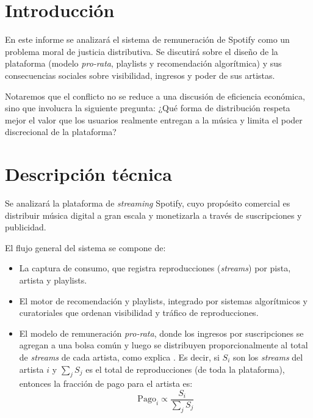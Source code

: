 \documentclass[12pt,a4paper]{article}
\author{Juan Pablo Cuevas\\Ética para Ciencia de Datos y Estadística}
\date{Marzo 2026}
\begin{document}
\maketitle

\section{Introducción}
En este informe se analizará el sistema de remuneración de Spotify como un problema moral de justicia distributiva. Se discutirá sobre el diseño de la plataforma (modelo \textit{pro-rata}, playlists y recomendación algorítmica) y sus consecuencias sociales sobre visibilidad, ingresos y poder de sus artistas.

Notaremos que el conflicto no se reduce a una discusión de eficiencia económica, sino que involucra la siguiente pregunta: ¿Qué forma de distribución respeta mejor el valor que los usuarios realmente entregan a la música y limita el poder discrecional de la plataforma? 

\section{Descripción técnica}
Se analizará la plataforma de \textit{streaming} Spotify, cuyo propósito comercial es distribuir música digital a gran escala y monetizarla a través de suscripciones y publicidad.

El flujo general del sistema se compone de:

\begin{itemize}
    \item La captura de consumo, que registra reproducciones (\textit{streams}) por pista, artista y playlists.

    \item El motor de recomendación y playlists, integrado por sistemas algorítmicos y curatoriales que ordenan visibilidad y tráfico de reproducciones.

    \item El modelo de remuneración \textit{pro-rata}, donde los ingresos por suscripciones se agregan a una bolsa común y luego se distribuyen proporcionalmente al total de \textit{streams} de cada artista, como explica . Es decir, si $S_i$ son los \textit{streams} del artista $i$ y $\sum_j S_j$ es el total de reproducciones (de toda la plataforma), entonces la fracción de pago para el artista es:
    $$
    \mathrm{Pago}_i \propto \frac{S_i}{\sum_j S_j}
    $$

\end{itemize}
\end{document}
